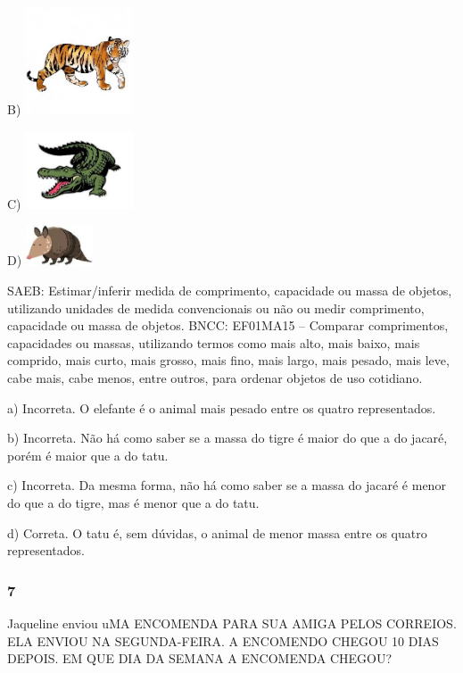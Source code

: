 \begin{itemize}
\begin{itemize}
B)
\includegraphics[width=1.25000in,height=1.25000in]{media/image148.jpg}

C)
\includegraphics[width=1.25876in,height=0.90692in]{media/image149.jpg}

D)
\includegraphics[width=0.78483in,height=0.47141in]{media/image150.jpg}

SAEB: Estimar/inferir medida de comprimento, capacidade ou massa
de objetos, utilizando unidades de medida convencionais ou não ou medir
comprimento, capacidade ou massa de objetos.
BNCC: EF01MA15 -- Comparar comprimentos, capacidades ou massas,
utilizando termos como mais alto, mais baixo, mais comprido, mais curto,
mais grosso, mais fino, mais largo, mais pesado, mais leve, cabe mais,
cabe menos, entre outros, para ordenar objetos de uso cotidiano.

a) Incorreta. O elefante é o animal mais pesado entre os quatro representados.

b) Incorreta. Não há como saber se a massa do tigre é maior do que a do
jacaré, porém é maior que a do tatu.

c) Incorreta. Da mesma forma, não há como saber se a massa do jacaré é
menor do que a do tigre, mas é menor que a do tatu.

d) Correta. O tatu é, sem dúvidas, o animal de menor massa entre os
quatro representados.

\subsubsection{7}\label{section-123}

Jaqueline enviou uMA ENCOMENDA PARA SUA AMIGA PELOS CORREIOS. ELA
ENVIOU NA SEGUNDA-FEIRA. A ENCOMENDO CHEGOU 10 DIAS DEPOIS. EM QUE DIA
DA SEMANA A ENCOMENDA CHEGOU?


\end{itemize}
\end{itemize}
